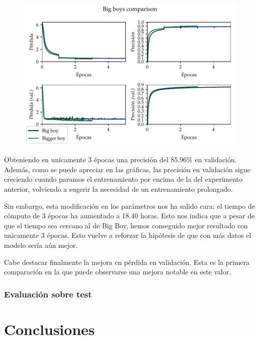 \documentclass[a4paper, 20pt, dvipsnames]{article}
\begin{document}
\begin{figure}[H]
	\centering
	\includegraphics{fig/bigboys.pdf}
\end{figure}

Obteniendo en unicamente 3 épocas una precisión del 85.96\% en
validación. Además, como se puede apreciar en las gráficas, las precisión en
validación sigue creciendo cuando paramos el entrenamiento por encima de la del
experimento anterior, volviendo a sugerir la necesidad de un entrenamiento
prolongado.

Sin embargo, esta modificación en los parámetros nos ha salido cara: el tiempo
de cómputo de 3 épocas ha aumentado a 18.40 horas. Esto nos indica que a pesar
de que el tiempo sea cercano al de Big Boy, hemos conseguido mejor resultado con
unicamente 3 épocas. Esto vuelve a reforzar la hipótesis de que con más datos el
modelo sería aún mejor.

Cabe destacar finalmente la mejora en pérdida en validación. Esta es la primera
comparación en la que puede observarse una mejora notable en este valor.


\subsubsection{Evaluación sobre test}

\section{Conclusiones}











\printbibliography
\end{document}
